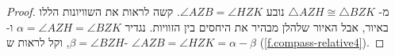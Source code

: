 \begin{proof}
%

מ-%
$\triangle AZH \cong \triangle BZK$
נובע
$\angle AZB = \angle HZK$.
קשה לראות את השוויונות הללו באיור, אבל האיור שלהלן מבהיר את היחסים בין הזוויות. נגדיר
$\alpha = \angle AZH = \angle BZK$
ו-%
$\beta = \angle BZH$,
וקל לראות ש-%
$\angle AZB = \angle HZK = \alpha - \beta$
(\ref{f.compass-relative4}).


\end{proof}

